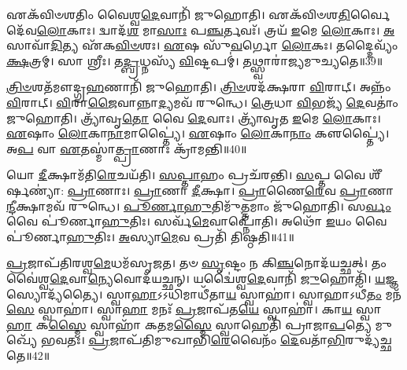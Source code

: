 𑌏𑌕᳴𑌵𑌿𑍞𑌶𑌤𑌿𑌂 𑌵𑍈𑌶𑍍𑌵\-\ul{𑌦𑍇}\-𑌵𑌾𑌨𑌿᳴ 𑌜𑍁𑌹𑍋𑌤𑌿।
𑌏𑌕᳴𑌵𑌿𑍞𑌶\-\ul{𑌤𑌿}\-𑌰𑍍𑌵𑍈 𑌦𑍇᳴𑌵\-\ul{𑌲𑍋}\-𑌕𑌾𑌃।
𑌦𑍍𑌵𑌾𑌦᳴\-\ul{𑌶} 𑌮𑌾\-\ul{𑌸𑌾𑌃} 𑌪\-\ul{𑌞𑍍𑌚}\-𑌰𑍍𑌤𑌵𑌃᳴।
𑌤𑍍𑌰𑌯᳴ \ul{𑌇}\-𑌮𑍇 \ul{𑌲𑍋}\-𑌕𑌾𑌃।
\-\ul{𑌅}\-𑌸𑌾𑌵𑌾᳴\-\ul{𑌦𑌿}\-𑌤𑍍𑌯 𑌏᳴𑌕\-\ul{𑌵𑌿}\-\-\ul{𑍞}\-𑌶𑌃।
\-\ul{𑌏}\-𑌷 𑌸𑍁᳴\-\ul{𑌵}\-𑌰𑍍𑌗𑍋 \ul{𑌲𑍋}\-𑌕𑌃।
𑌤𑌦𑍍𑌦𑍈𑌵𑍍𑌯𑌂᳴ \ul{𑌕𑍍𑌷}\-𑌤𑍍𑌰𑌮𑍍।
𑌸𑌾 𑌶𑍍𑌰𑍀𑌃।
𑌤\-\ul{𑌦𑍍𑌬𑍍𑌰}\-𑌧𑍍𑌨𑌸𑍍𑌯᳴ \ul{𑌵𑌿}\-𑌷𑍍𑌟𑌪𑌮𑍍॑।
𑌤𑌥𑍍𑌸𑍍𑌵𑌾𑌰𑌾॑𑌜𑍍𑌯𑌮𑍁𑌚𑍍𑌯𑌤𑍇॥39॥

\-\ul{𑌤𑍍𑌰𑌿}\-\-\ul{𑍞}\-𑌶𑌤᳴𑌮𑍗𑌦𑍍𑌗𑍍𑌰\-\ul{𑌹}\-𑌣𑌾𑌨𑌿᳴ 𑌜𑍁𑌹𑍋𑌤𑌿।
\-\ul{𑌤𑍍𑌰𑌿}\-\-\ul{𑍞}\-𑌶𑌦᳴𑌕𑍍𑌷𑌰𑌾 \ul{𑌵𑌿}\-𑌰𑌾𑌟𑍍।
𑌅𑌨𑍍𑌨𑌂᳴ \ul{𑌵𑌿}\-𑌰𑌾𑌟𑍍।
\-\ul{𑌵𑌿}\-𑌰𑌾\-\ul{𑌜𑍈}\-𑌵𑌾𑌨𑍍𑌨𑌾\-\ul{𑌦𑍍𑌯}\-𑌮𑌵᳴ 𑌰𑍁𑌨𑍍𑌧𑍇।
\-\ul{𑌤𑍍𑌰𑍇}\-𑌧𑌾 \ul{𑌵𑌿}\-𑌭𑌜𑍍𑌯᳴ \ul{𑌦𑍇}\-𑌵𑌤𑌾𑌂॑ 𑌜𑍁𑌹𑍋𑌤𑌿।
𑌤𑍍𑌰𑍍𑌯𑌾᳴𑌵𑍃\-\ul{𑌤𑍋} 𑌵𑍈 \ul{𑌦𑍇}\-𑌵𑌾𑌃।
𑌤𑍍𑌰𑍍𑌯𑌾᳴𑌵𑍃𑌤 \ul{𑌇}\-𑌮𑍇 \ul{𑌲𑍋}\-𑌕𑌾𑌃।
\-\ul{𑌏}\-𑌷𑌾𑌂 \ul{𑌲𑍋}\-𑌕𑌾\-\ul{𑌨𑌾}\-𑌮𑌾𑌪𑍍𑌤𑍍𑌯𑍈॑।
\-\ul{𑌏}\-𑌷𑌾𑌂 \ul{𑌲𑍋}\-𑌕𑌾\-\ul{𑌨𑌾𑌂} 𑌕𑍢𑌪𑍍𑌤𑍍𑌯𑍈॑।
𑌅\-\ul{𑌪} 𑌵𑌾 \ul{𑌏}\-𑌤𑌸𑍍𑌮𑌾॑\-\ul{𑌤𑍍𑌪𑍍𑌰𑌾}\-𑌣𑌾𑌃 𑌕𑍍𑌰𑌾᳴𑌮𑌨𑍍𑌤𑌿॥40॥

𑌯𑍋 \ul{𑌦𑍀}\-𑌕𑍍𑌷𑌾𑌮᳴𑌤𑌿\-\ul{𑌰𑍇}\-𑌚𑌯᳴𑌤𑌿।
\-\ul{𑌸}\-\-\ul{𑌪𑍍𑌤𑌾}\-𑌹𑌂 𑌪𑍍𑌰𑌚᳴𑌰𑌨𑍍𑌤𑌿।
\-\ul{𑌸}\-𑌪𑍍𑌤 𑌵𑍈 𑌶𑍀᳴𑌰𑍍\mbox{}\-\ul{𑌷}\-𑌣𑍍𑌯𑌾॑: \ul{𑌪𑍍𑌰𑌾}\-𑌣𑌾𑌃।
\-\ul{𑌪𑍍𑌰𑌾}\-𑌣𑌾 \ul{𑌦𑍀}\-𑌕𑍍𑌷𑌾।
\-\ul{𑌪𑍍𑌰𑌾}\-𑌣𑍈\-\ul{𑌰𑍇}\-𑌵 \ul{𑌪𑍍𑌰𑌾}\-𑌣𑌾\-\ul{𑌨𑍍𑌦𑍀}\-𑌕𑍍𑌷𑌾𑌮𑌵᳴ 𑌰𑍁𑌨𑍍𑌧𑍇।
\-\ul{𑌪𑍂}\-\-\ul{𑌰𑍍𑌣𑌾}\-\-\ul{𑌹𑍁}\-𑌤𑌿𑌮𑍁᳴\-\ul{𑌤𑍍𑌤}\-𑌮𑌾𑌂 𑌜𑍁᳴𑌹𑍋𑌤𑌿।
𑌸\-\ul{𑌰𑍍𑌵𑌂} 𑌵𑍈 𑌪𑍂॑𑌰𑍍𑌣𑌾\-\ul{𑌹𑍁}\-𑌤𑌿𑌃।
𑌸𑌰𑍍𑌵᳴\-\-\ul{𑌮𑍇}\-𑌵𑌾\-𑌪𑍍𑌨𑍋᳴𑌤𑌿।
𑌅𑌥𑍋᳴ \ul{𑌇}\-𑌯𑌂 𑌵𑍈 𑌪𑍂॑𑌰𑍍𑌣𑌾\-\ul{𑌹𑍁}\-𑌤𑌿𑌃।
\-\ul{𑌅}\-𑌸𑍍𑌯𑌾\-\ul{𑌮𑍇}\-𑌵 𑌪𑍍𑌰𑌤𑌿᳴ 𑌤𑌿𑌷𑍍𑌠𑌤𑌿॥41॥\anuvakamend[\-\ul{𑌰𑍁}\-\-\ul{𑌨𑍍𑌧𑍇} \ul{𑌪𑍍𑌰𑌾}\-𑌣𑌾\-\ul{𑌨𑍍𑌦𑍀}\-𑌕𑍍𑌷𑌾𑌮𑌵᳴ 𑌰𑍁𑌨𑍍𑌧 𑌉𑌚𑍍𑌯𑌤𑍇 𑌕𑍍𑌰𑌾𑌮𑌨𑍍𑌤𑌿 𑌤𑌿𑌷𑍍𑌠𑌤𑌿]

\-\ul{𑌪𑍍𑌰}\-𑌜𑌾𑌪᳴𑌤𑌿𑌰𑌶𑍍𑌵\-\ul{𑌮𑍇}\-𑌧𑌮᳴\-𑌸𑍃𑌜𑌤।
𑌤𑍞 \ul{𑌸𑍃}\-𑌷𑍍𑌟𑌂 𑌨 𑌕𑌿\-\ul{𑌞𑍍𑌚}\-𑌨𑍋𑌦᳴𑌯𑌚𑍍𑌛𑌤𑍍।
𑌤𑌂 𑌵𑍈॑𑌶𑍍𑌵\-\ul{𑌦𑍇}\-𑌵𑌾\-\ul{𑌨𑍍𑌯𑍇}\-𑌵𑍋𑌦᳴𑌯𑌚𑍍𑌛𑌨𑍍।
𑌯𑌦𑍍𑌵𑍈॑𑌶𑍍𑌵\-\ul{𑌦𑍇}\-𑌵𑌾𑌨𑌿᳴ \ul{𑌜𑍁}\-𑌹𑍋𑌤𑌿᳴।
\-\ul{𑌯}\-𑌜𑍍𑌞𑌸𑍍𑌯𑍋𑌦𑍍𑌯᳴𑌤𑍍𑌯𑍈।
𑌸𑍍𑌵𑌾\-\ul{𑌹𑌾}\-\-𑌽𑌽𑌧𑌿𑌮𑌾𑌧𑍀᳴𑌤𑌾\-\ul{𑌯} 𑌸𑍍𑌵𑌾𑌹𑌾॑।
𑌸𑍍𑌵𑌾𑌹𑌾\-𑌽𑌧𑍀᳴\-\ul{𑌤𑌂} 𑌮𑌨᳴\-\ul{𑌸𑍇} 𑌸𑍍𑌵𑌾𑌹𑌾॑।
𑌸𑍍𑌵𑌾\-\ul{𑌹𑌾} 𑌮𑌨𑌃᳴ \ul{𑌪𑍍𑌰}\-𑌜𑌾𑌪᳴𑌤\-\ul{𑌯𑍇} 𑌸𑍍𑌵𑌾𑌹𑌾॑।
𑌕𑌾\-\ul{𑌯} 𑌸𑍍𑌵𑌾\-\ul{𑌹𑌾} 𑌕\-\ul{𑌸𑍍𑌮𑍈} 𑌸𑍍𑌵𑌾𑌹𑌾᳴ 𑌕\-\ul{𑌤}\-𑌮\-\ul{𑌸𑍍𑌮𑍈} 𑌸𑍍𑌵𑌾𑌹𑍇𑌤𑌿᳴ 𑌪𑍍𑌰𑌾𑌜𑌾\-\ul{𑌪}\-𑌤𑍍𑌯𑍇 𑌮𑍁𑌖𑍍𑌯𑍇᳴ 𑌭𑌵𑌤𑌃।
\-\ul{𑌪𑍍𑌰}\-𑌜𑌾𑌪᳴𑌤𑌿𑌮𑍁𑌖𑌾𑌭𑌿\-\ul{𑌰𑍇}\-𑌵𑍈𑌨𑌂᳴ \ul{𑌦𑍇}\-𑌵𑌤𑌾᳴\-\ul{𑌭𑌿}\-𑌰𑍁𑌦𑍍𑌯᳴𑌚𑍍𑌛𑌤𑍇॥42॥

